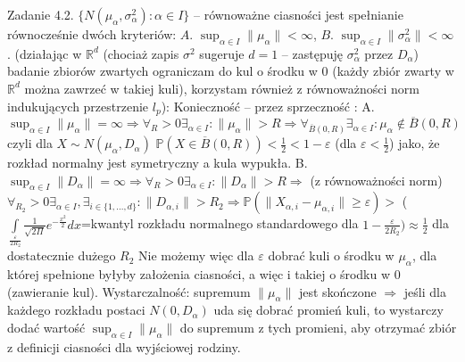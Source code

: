 \documentclass{article}
\begin{document}
Zadanie 4.2.
\newline
\newline
$\{N(\mu_\alpha,\sigma^2_\alpha):\alpha\in I\}$ -- równoważne ciasności jest spełnianie równocześnie dwóch kryteriów:\newline
$A.$ $\sup_{\alpha\in I}\lVert\mu_\alpha\rVert<\infty$,\newline
$B.$ $\sup_{\alpha\in I}\lVert\sigma^2_\alpha\rVert<\infty$.\newline
(działając w $\mathbb{R}^d$ (chociaż zapis $\sigma^2$ sugeruje $d=1$ -- zastępuję $\sigma^2_\alpha$ przez $D_\alpha$)
badanie zbiorów zwartych ograniczam do kul o środku w 0 (każdy zbiór zwarty w $\mathbb{R}^d$ można zawrzeć w takiej kuli),
korzystam również z równoważności norm indukujących przestrzenie $l_p$):\newline
Konieczność -- przez sprzeczność :\newline
A. $\sup_{\alpha\in I}\lVert\mu_\alpha\rVert=\infty\Rightarrow\forall_R>0\exists_{\alpha\in I}:\lVert\mu_\alpha\rVert>R\Rightarrow
\forall_{\overline{B}(0,R)}\exists_{\alpha\in I}:\mu_\alpha\notin \overline{B}(0,R)$
czyli dla $X\sim N(\mu_{\alpha},D_\alpha)$ $\mathbb{P}(X\in\overline{B}(0,R))<\frac{1}{2}<1-\varepsilon$ (dla $\varepsilon<\frac{1}{2}$) jako, że rozkład normalny jest symetryczny a kula wypukła.\newline
B. $\sup_{\alpha\in I}\lVert D_\alpha\rVert=\infty\Rightarrow\forall_R>0\exists_{\alpha\in I}:\lVert D_\alpha\rVert>R\Rightarrow$
(z równoważności norm)\newline
$\forall_{R_2}>0\exists_{\alpha\in I},\exists_{i\in\{1,...,d\}}:\lVert D_{\alpha,i}\rVert>R_2\Rightarrow
\mathbb{P}(\lVert X_{\alpha,i}-\mu_{\alpha,i}\rVert\ge\varepsilon)>$
($\int\limits_{\frac{\varepsilon}{2R_2}}\frac{1}{\sqrt{2\Pi}}e^{-\frac{x^2}{2}}dx$=kwantyl rozkładu normalnego standardowego dla $1-\frac{\varepsilon}{2R_2})\approx\frac{1}{2}$ dla dostatecznie dużego $R_2$\newline
Nie możemy więc dla $\varepsilon$ dobrać kuli o środku w $\mu_\alpha$, dla której spełnione byłyby założenia ciasności, a więc i takiej o środku w $0$ (zawieranie kul).\newline\newline
Wystarczalność: supremum $\lVert\mu_\alpha\rVert$ jest skończone $\Rightarrow$ jeśli dla każdego rozkładu postaci $N(0,D_\alpha)$ uda się dobrać promień kuli,
to wystarczy dodać wartość $\sup_{\alpha\in I}\lVert\mu_\alpha\rVert$ do supremum z tych promieni, aby otrzymać zbiór z definicji ciasności dla wyjściowej rodziny.\newline
\end{document}
